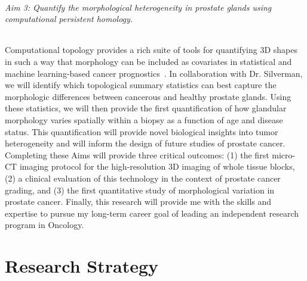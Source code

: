 \documentclass{NIHGrant}
\theoremstyle{theorem}
\begin{document}
\paragraph*{Aim 3: Quantify the morphological heterogeneity in prostate glands using computational persistent homology.}

Computational topology provides a rich suite of tools for quantifying 3D shapes in such a way that morphology can be included as covariates in statistical and machine learning-based cancer prognostics~\cite{primakov_automated_2022,crawford_predicting_2020}. In collaboration with Dr. Silverman, we will identify which topological summary statistics can best capture the morphologic differences between cancerous and healthy prostate glands. Using these statistics, we will then provide the first quantification of how glandular morphology varies spatially within a biopsy as a function of age and disease status. This quantification will provide novel biological insights into tumor heterogeneity and will inform the design of future studies of prostate cancer.  \\[5pt]
%
\noindent
Completing these Aims will provide three critical outcomes: (1) the first micro-CT imaging protocol for the high-resolution 3D imaging of whole tissue blocks, (2) a clinical evaluation of this technology in the context of prostate cancer grading, and (3) the first quantitative study of morphological variation in prostate cancer. Finally, this research will provide me with the skills and expertise to pursue my long-term career goal of leading an independent research program in Oncology.

\newpage
\part*{Research Strategy}
\end{document}
